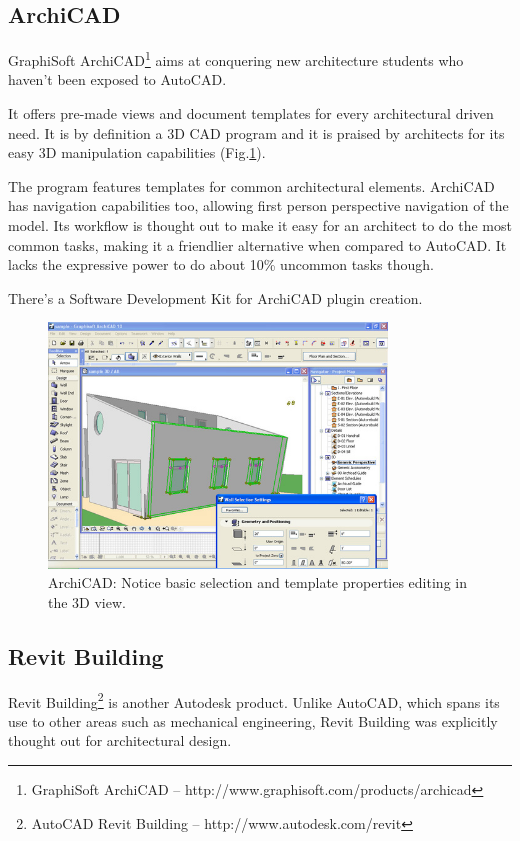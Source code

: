\subsection{ArchiCAD}
GraphiSoft ArchiCAD\footnote{GraphiSoft ArchiCAD -- http://www.graphisoft.com/products/archicad}
aims at conquering new architecture students who haven't been exposed to AutoCAD.

It offers pre-made views and document templates for every architectural driven need.
It is by definition a 3D CAD program and it is praised by architects for its easy 3D
manipulation capabilities (Fig.\ref{FIG-ARCHICAD}).

The program features templates for common architectural elements.
ArchiCAD has navigation capabilities too, allowing first person perspective navigation of the model.
Its workflow is thought out to make it easy for an architect to do the most common tasks,
making it a friendlier alternative when compared to AutoCAD.
It lacks the expressive power to do about 10\% uncommon tasks though.

There's a Software Development Kit for ArchiCAD plugin creation.

\begin{figure}[!ht]
    \centering
    \includegraphics[width=9cm]{gfx/archicad-1.png}
    \caption{ArchiCAD: Notice basic selection and template properties editing in the 3D view.}
    \label{FIG-ARCHICAD}
\end{figure}

\subsection{Revit Building}
Revit Building\footnote{AutoCAD Revit Building -- http://www.autodesk.com/revit}
is another Autodesk product.
Unlike AutoCAD, which spans its use to other areas such as mechanical engineering,
Revit Building was explicitly thought out for architectural design.

